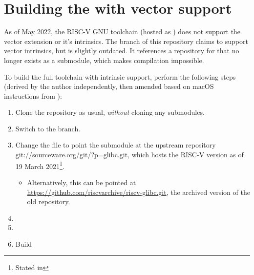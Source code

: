 \chapter{Building the  with vector support}\label{appx:building_rvv_gcc_toolchain}

As of May 2022, the RISC-V GNU toolchain (hosted as ) does not support the vector extension or it's intrinsics.
The  branch of this repository claims to support vector intrinsics, but is slightly outdated.
It references a repository for  that no longer exists as a submodule, which makes compilation impossible.

To build the full toolchain with intrinsic support, perform the following steps (derived by the author independently, then amended based on macOS instructions from ):
\begin{enumerate}
    \item Clone the repository as usual, \emph{without} cloning any submodules.
    \item Switch to the  branch.
    \item Change the  file to point the  submodule at the upstream  repository \url{git://sourceware.org/git/?p=glibc.git}, which hosts the RISC-V version as of 19 March 2021\footnote{Stated in }.
    
    \begin{itemize}
        \item Alternatively, this can be pointed at \url{https://github.com/riscvarchive/riscv-glibc.git}, the archived version of the old repository.
    \end{itemize}
    
    \item {}
    \item {}
    \item Build
\end{enumerate}

